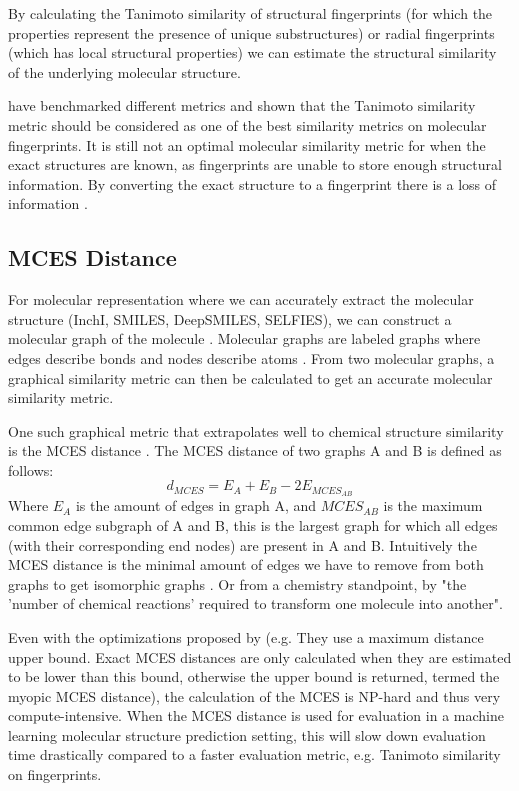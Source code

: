 By calculating the Tanimoto similarity of structural fingerprints (for which the properties represent the presence of unique substructures) or radial fingerprints (which has local structural properties) we can estimate the structural similarity of the underlying molecular structure.

\textcite{bajusz2015tanimoto} have benchmarked different metrics and shown that the Tanimoto similarity metric should be considered as one of the best similarity metrics on molecular fingerprints. It is still not an optimal molecular similarity metric for when the exact structures are known, as fingerprints are unable to store enough structural information. By converting the exact structure to a fingerprint there is a loss of information \cite{kretschmer2023small}.

\subsection{MCES Distance}
\label{sec:mces_dist}

For molecular representation where we can accurately extract the molecular structure (InchI, SMILES, DeepSMILES, SELFIES), we can construct a molecular graph of the molecule \cite{wigh2022review}. Molecular graphs are labeled graphs where edges describe bonds and nodes describe atoms \cite{kretschmer2023small}. From two molecular graphs, a graphical similarity metric can then be calculated to get an accurate molecular similarity metric. 

One such graphical metric that extrapolates well to chemical structure similarity is the \ac{MCES} distance \cite{kretschmer2023small}. The MCES distance of two graphs A and B is defined as follows:
\[d_{MCES} = E_A + E_B - 2E_{MCES_{AB}}\]
Where $E_A$ is the amount of edges in graph A, and $MCES_{AB}$ is the maximum common edge subgraph of A and B, this is the largest graph for which all edges (with their corresponding end nodes) are present in A and B. Intuitively the MCES distance is the minimal amount of edges we have to remove from both graphs to get isomorphic graphs \cite{kretschmer2023small}. Or from a chemistry standpoint, by \textcite{kretschmer2023small} "the 'number of chemical reactions' required to transform one molecule into another".

Even with the optimizations proposed by \textcite{kretschmer2023small}
(e.g. They use a maximum distance upper bound.
Exact MCES distances are only calculated when they are estimated to be lower than this bound,
otherwise the upper bound is returned, termed the myopic MCES distance),
the calculation of the MCES is NP-hard and thus very compute-intensive.
When the MCES distance is used for evaluation in a machine learning molecular structure prediction setting,
this will slow down evaluation time drastically compared to a faster evaluation metric, e.g. Tanimoto similarity on fingerprints.

